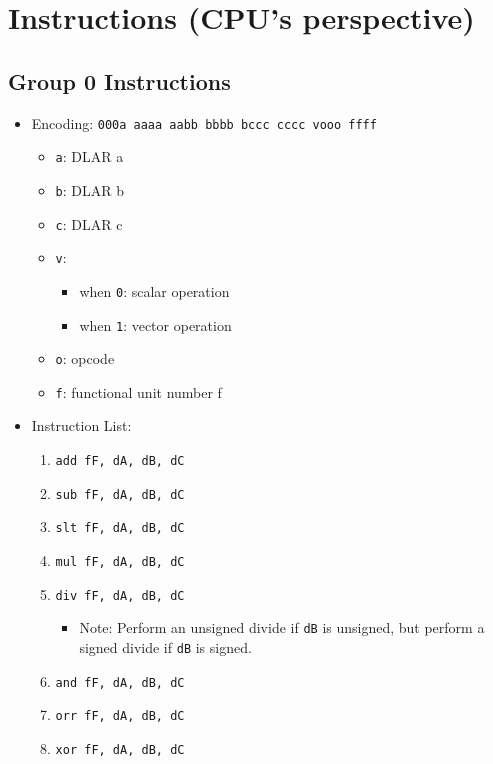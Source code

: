 \documentclass{article}
\begin{document}
\newpage
\section{Instructions (CPU's perspective)}
	\subsection{Group 0 Instructions}
		\begin{itemize}
		\item Encoding:  \texttt{000a aaaa aabb bbbb  bccc cccc vooo ffff}
			\begin{itemize}
			\item \texttt{a}:  DLAR a
			\item \texttt{b}:  DLAR b
			\item \texttt{c}:  DLAR c
			\item \texttt{v}:
				\begin{itemize}
				\item when \texttt{0}:  scalar operation
				\item when \texttt{1}:  vector operation
				\end{itemize}
			\item \texttt{o}:  opcode
			\item \texttt{f}:  functional unit number f
			\end{itemize}
		\item Instruction List:
			\begin{enumerate}
			\item \texttt{add fF, dA, dB, dC}
			\item \texttt{sub fF, dA, dB, dC}
			\item \texttt{slt fF, dA, dB, dC}
			\item \texttt{mul fF, dA, dB, dC}

			\item \texttt{div fF, dA, dB, dC}
				\begin{itemize}
				\item Note:  Perform an unsigned divide if \texttt{dB} is
					unsigned, but perform a signed divide if \texttt{dB} is
					signed.
				\end{itemize}
			\item \texttt{and fF, dA, dB, dC}
			\item \texttt{orr fF, dA, dB, dC}
			\item \texttt{xor fF, dA, dB, dC}
			\end{enumerate}
		\end{itemize}
\end{document}

